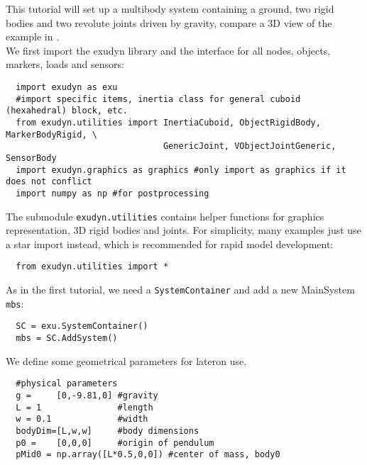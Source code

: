 This tutorial will set up a multibody system containing a ground, two rigid bodies and two revolute joints driven by gravity, compare a 3D view of the example in .
%
%
%
%
\horizontalRuler\\
\noindent We first import the exudyn library and the interface for all nodes, objects, markers, loads and sensors:
\pythonstyle\begin{lstlisting}
  import exudyn as exu
  #import specific items, inertia class for general cuboid (hexahedral) block, etc.
  from exudyn.utilities import InertiaCuboid, ObjectRigidBody, MarkerBodyRigid, \
                               GenericJoint, VObjectJointGeneric, SensorBody
  import exudyn.graphics as graphics #only import as graphics if it does not conflict
  import numpy as np #for postprocessing
\end{lstlisting}
The submodule \texttt{exudyn.utilities} contains helper functions for graphics representation, 3D rigid bodies and joints.
For simplicity, many examples just use a star import instead, which is recommended for rapid model development:
\pythonstyle\begin{lstlisting}
  from exudyn.utilities import *
\end{lstlisting}


\noindent As in the first tutorial, we need a \texttt{SystemContainer} and add a new MainSystem \texttt{mbs}:
\pythonstyle\begin{lstlisting}
  SC = exu.SystemContainer()
  mbs = SC.AddSystem()
\end{lstlisting}

\noindent We define some geometrical parameters for lateron use.
\pythonstyle\begin{lstlisting}
  #physical parameters
  g =     [0,-9.81,0] #gravity
  L = 1               #length
  w = 0.1             #width
  bodyDim=[L,w,w]     #body dimensions
  p0 =    [0,0,0]     #origin of pendulum
  pMid0 = np.array([L*0.5,0,0]) #center of mass, body0
\end{lstlisting}

